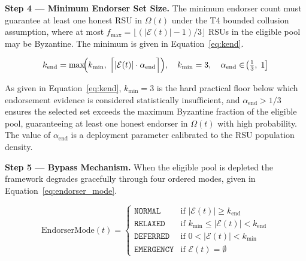 \documentclass[12pt, a4paper]{report}
\newcommand{\mypar}{\vspace{0.8em}\noindent}
\begin{document}
\mypar
\textbf{Step 4 — Minimum Endorser Set Size.}
The minimum endorser count must guarantee at least one honest
RSU in $\Omega(t)$ under the T4 bounded collusion assumption,
where at most $f_{\max} = \lfloor(|\mathcal{E}(t)|-1)/3\rfloor$
RSUs in the eligible pool may be Byzantine. The minimum is given
in Equation~\eqref{eq:kend}.

\begin{equation}
\label{eq:kend}
k_{\text{end}} =
\max\!\Bigl(
k_{\min},\;
\Bigl\lceil
|\mathcal{E}(t)| \cdot \alpha_{\text{end}}
\Bigr\rceil
\Bigr),
\quad
k_{\min} = 3,
\quad
\alpha_{\text{end}} \in
\!\left(\tfrac{1}{3},\; 1\right]
\end{equation}

As given in Equation~\eqref{eq:kend}, $k_{\min} = 3$ is the
hard practical floor below which endorsement evidence is
considered statistically insufficient, and
$\alpha_{\text{end}} > 1/3$ ensures the selected set exceeds
the maximum Byzantine fraction of the eligible pool, guaranteeing
at least one honest endorser in $\Omega(t)$ with high probability.
The value of $\alpha_{\text{end}}$ is a deployment parameter
calibrated to the RSU population density.

\mypar
\textbf{Step 5 — Bypass Mechanism.}
When the eligible pool is depleted the framework degrades
gracefully through four ordered modes, given in
Equation~\eqref{eq:endorser_mode}.

\begin{equation}
\label{eq:endorser_mode}
\mathrm{EndorserMode}(t) =
\begin{cases}
\texttt{NORMAL}
  & \text{if } |\mathcal{E}(t)| \geq k_{\text{end}} \\[4pt]
\texttt{RELAXED}
  & \text{if } k_{\min} \leq |\mathcal{E}(t)| < k_{\text{end}} \\[4pt]
\texttt{DEFERRED}
  & \text{if } 0 < |\mathcal{E}(t)| < k_{\min} \\[4pt]
\texttt{EMERGENCY}
  & \text{if } \mathcal{E}(t) = \emptyset
\end{cases}
\end{equation}
\end{document}
